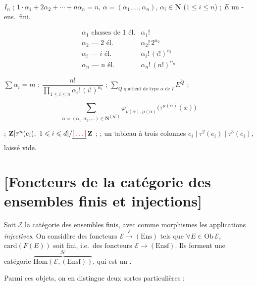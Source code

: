 \documentclass[11pt,a4paper]{article}
\begin{document}
$I_n$ ; \quad $1\cdot\alpha_1 + 2\alpha_2 + \cdots + n\alpha_n = n$, \quad
$\alpha = (\alpha_1, \ldots, \alpha_n)$, $\alpha_i \in \mathbf{N}$
($1 \leqslant i \leqslant n$) ; $E$ un -ens.\ fini.

\[
  \begin{array}{ll}
    \alpha_1 \text{ classes de 1 él.} & \alpha_1! \\
    \alpha_2 \text{ — 2 él.} & \alpha_2!\,2^{\alpha_2} \\
    \alpha_i \text{ — } i \text{ él.} & \alpha_i!\,(i!)^{\alpha_i} \\
    \alpha_n \text{ — } n \text{ él.} & \alpha_n!\,(n!)^{\alpha_n}
  \end{array}
\]

$\sum \alpha_i = m$ ; \qquad
$\dfrac{n!}{\prod_{1 \leqslant i \leqslant n} \alpha_i!\,(i!)^{\alpha_i}}$ ;
\qquad $\sum_{Q \text{ quotient de type } \alpha \text{ de } I} E^{\widetilde{Q}}$ ;

\[
  \sum_{\alpha = (\alpha_1, \alpha_2, \ldots) \in \mathbf{N}^{(\mathbf{N}^*)}}
  \varphi_{\nu(\alpha), \mu(\alpha)}\bigl(\tau^{\mu(\alpha)}(x)\bigr)
\]

 ; \quad
$\mathbf{Z}[\tau^n(e_i),\ 1 \leqslant i \leqslant d] / \struck{\ill{}}\,
\mathbf{Z}$ ; \quad {} ; \quad un tableau à trois colonnes
$e_i \mid \tau^2(e_i) \mid \tau^3(e_i)$, laissé vide.

\section{[Foncteurs de la catégorie des ensembles finis et injections]}

Soit $\mathcal{E}$ la catégorie des ensembles finis, avec comme morphismes les
applications \emph{injectives}. On considère des foncteurs
$\mathcal{E} \xrightarrow{F} (\mathrm{Ens})$ tels que
$\forall E \in \mathrm{Ob}\,\mathcal{E}$, $\mathrm{card}(F(E))$ soit fini,
i.e.\ des foncteurs $\mathcal{E} \to (\mathrm{Ensf})$. Ils forment une
catégorie
$\overbrace{\underline{\mathrm{Hom}}(\mathcal{E}, (\mathrm{Ensf}))}^{\mathcal{H}}$,
qui est un .

Parmi ces objets, on en distingue deux sortes particulières :
\end{document}
